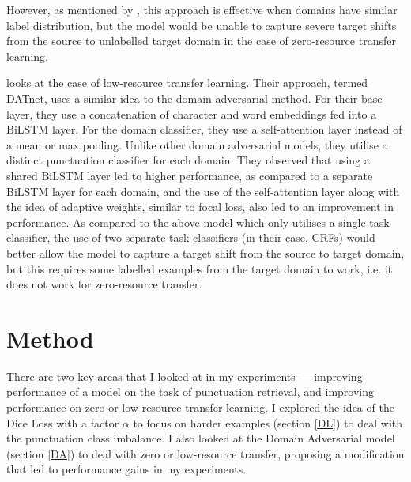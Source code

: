 \documentclass[a4paper]{article}
\begin{document}
\begin{multicols}{2}
However, as mentioned by \cite{targetshiftadv}, this approach is effective when domains have similar label distribution, but the model would be unable to capture severe target shifts from the source to unlabelled target domain in the case of zero-resource transfer learning.

\cite{DATnet} looks at the case of low-resource transfer learning. Their approach, termed DATnet, uses a similar idea to the domain adversarial method. For their base layer, they use a concatenation of character and word embeddings fed into a BiLSTM layer. For the domain classifier, they use a self-attention layer instead of a mean or max pooling. Unlike other domain adversarial models, they utilise a distinct punctuation classifier for each domain. They observed that using a shared BiLSTM layer led to higher performance, as compared to a separate BiLSTM layer for each domain, and the use of the self-attention layer along with the idea of adaptive weights, similar to focal loss, also led to an improvement in performance. As compared to the above model which only utilises a single task classifier, the use of two separate task classifiers (in their case, CRFs) would better allow the model to capture a target shift from the source to target domain, but this requires some labelled examples from the target domain to work, i.e. it does not work for zero-resource transfer.

\section{Method}
There are two key areas that I looked at in my experiments --- improving performance of a model on the task of punctuation retrieval, and improving performance on zero or low-resource transfer learning. I explored the idea of the Dice Loss with a factor $\alpha$ to focus on harder examples (section \ref{DL}) to deal with the punctuation class imbalance. I also looked at the Domain Adversarial model (section \ref{DA}) to deal with zero or low-resource transfer, proposing a modification that led to performance gains in my experiments.


\end{multicols}
\end{document}

